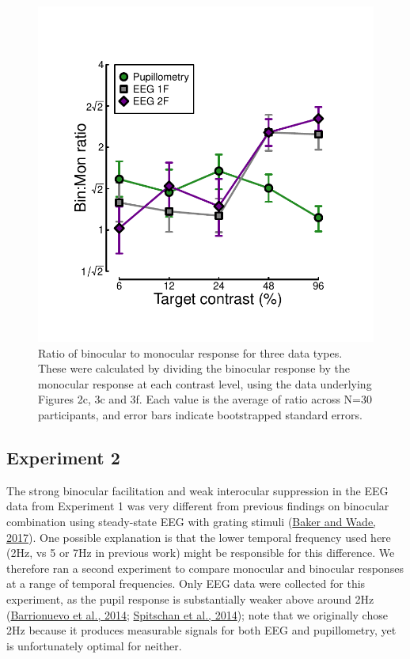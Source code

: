 \documentclass[
]{article}
\begin{document}
\begin{figure}

{\centering \includegraphics[width=0.5\linewidth]{Figures/BSratios} 

}

\caption{Ratio of binocular to monocular response for three data types. These were calculated by dividing the binocular response by the monocular response at each contrast level, using the data underlying Figures 2c, 3c and 3f. Each value is the average of ratio across N=30 participants, and error bars indicate bootstrapped standard errors.}\label{fig:BSratios}
\end{figure}

\hypertarget{experiment-2}{%
\subsection{Experiment 2}\label{experiment-2}}

The strong binocular facilitation and weak interocular suppression in the EEG data from Experiment 1 was very different from previous findings on binocular combination using steady-state EEG with grating stimuli (\protect\hyperlink{ref-Baker2017}{Baker and Wade, 2017}). One possible explanation is that the lower temporal frequency used here (2Hz, vs 5 or 7Hz in previous work) might be responsible for this difference. We therefore ran a second experiment to compare monocular and binocular responses at a range of temporal frequencies. Only EEG data were collected for this experiment, as the pupil response is substantially weaker above around 2Hz (\protect\hyperlink{ref-Barrionuevo2014}{Barrionuevo et al., 2014}; \protect\hyperlink{ref-Spitschan2014}{Spitschan et al., 2014}); note that we originally chose 2Hz because it produces measurable signals for both EEG and pupillometry, yet is unfortunately optimal for neither.
\end{document}
